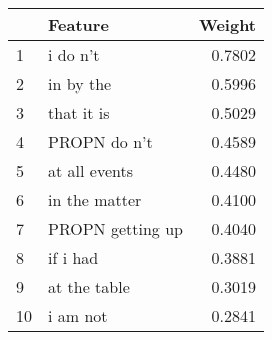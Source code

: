 \begin{tabular}{llr}
\toprule
{} &           Feature &  Weight \\
\midrule
1  &          i do n't &  0.7802 \\
2  &         in by the &  0.5996 \\
3  &        that it is &  0.5029 \\
4  &      PROPN do n't &  0.4589 \\
5  &     at all events &  0.4480 \\
6  &     in the matter &  0.4100 \\
7  &  PROPN getting up &  0.4040 \\
8  &          if i had &  0.3881 \\
9  &      at the table &  0.3019 \\
10 &          i am not &  0.2841 \\
\bottomrule
\end{tabular}
